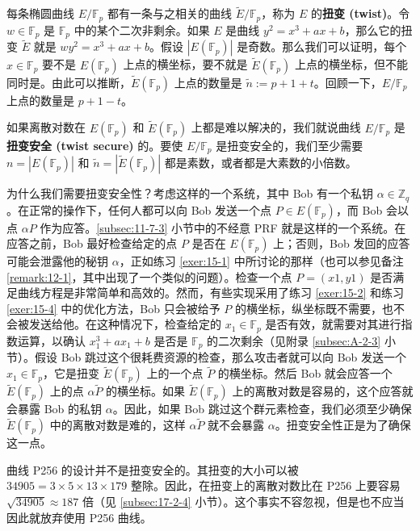 \begin{snote}[扭变安全性。]
每条椭圆曲线 $E/\mathbb{F}_p$ 都有一条与之相关的曲线 $\tilde E/\mathbb{F}_p$，称为 $E$ 的\textbf{扭变 (twist)}。令 $w\in\mathbb{F}_p$ 是 $\mathbb{F}_p$ 中的某个二次非剩余。如果 $E$ 是曲线 $y^2=x^3+ax+b$，那么它的扭变 $\tilde E$ 就是 $wy^2=x^3+ax+b$。假设 $|E(\mathbb{F}_{p})|$ 是奇数。那么我们可以证明，每个 $x\in\mathbb{F}_p$ 要不是 $E(\mathbb{F}_{p})$ 上点的横坐标，要不就是 $\tilde E(\mathbb{F}_{p})$ 上点的横坐标，但不能同时是。由此可以推断，$\tilde E(\mathbb{F}_{p})$ 上点的数量是 $\tilde n:=p+1+t$。回顾一下，$E/\mathbb{F}_p$ 上点的数量是 $p+1-t$。

如果离散对数在 $E(\mathbb{F}_{p})$ 和 $\tilde E(\mathbb{F}_{p})$ 上都是难以解决的，我们就说曲线 $E/\mathbb{F}_p$ 是\textbf{扭变安全 (twist secure)} 的。要使 $E/\mathbb{F}_p$ 是扭变安全的，我们至少需要 $n=|E(\mathbb{F}_{p})|$ 和 $\tilde n= |\tilde E(\mathbb{F}_{p})|$ 都是素数，或者都是大素数的小倍数。

为什么我们需要扭变安全性？考虑这样的一个系统，其中 Bob 有一个私钥 $α\in\mathbb{Z}_q$。在正常的操作下，任何人都可以向 Bob 发送一个点 $P\in E(\mathbb{F}_{p})$，而 Bob 会以点 $\alpha P$ 作为应答。\ref{subsec:11-7-3} 小节中的不经意 PRF 就是这样的一个系统。在应答之前，Bob 最好检查给定的点 $P$ 是否在 $E(\mathbb{F}_{p})$ 上；否则，Bob 发回的应答可能会泄露他的秘钥 $\alpha$，正如练习 \ref{exer:15-1} 中所讨论的那样（也可以参见备注 \ref{remark:12-1}，其中出现了一个类似的问题）。检查一个点 $P=(x1,y1)$ 是否满足曲线方程是非常简单和高效的。然而，有些实现采用了练习 \ref{exer:15-2} 和练习 \ref{exer:15-4} 中的优化方法，Bob 只会被给予 $P$ 的横坐标，纵坐标既不需要，也不会被发送给他。在这种情况下，检查给定的 $x_1∈\mathbb{F}_p$ 是否有效，就需要对其进行指数运算，以确认 $x^3_1+ax_1+b$ 是否是 $\mathbb{F}_p$ 的二次剩余（见附录 \ref{subsec:A-2-3} 小节）。假设 Bob 跳过这个很耗费资源的检查，那么攻击者就可以向 Bob 发送一个 $x_1∈\mathbb{F}_p$，它是扭变 $\tilde E(\mathbb{F}_{p})$ 上的一个点 $\tilde P$ 的横坐标。然后 Bob 就会应答一个 $\tilde E(\mathbb{F}_{p})$ 上的点 $\alpha\tilde P$ 的横坐标。如果 $\tilde E(\mathbb{F}_{p})$ 上的离散对数是容易的，这个应答就会暴露 Bob 的私钥 $\alpha$。因此，如果 Bob 跳过这个群元素检查，我们必须至少确保 $\tilde E(\mathbb{F}_{p})$ 中的离散对数是难的，这样 $\alpha\tilde P$ 就不会暴露 $\alpha$。扭变安全性正是为了确保这一点。

曲线 P256 的设计并不是扭变安全的。其扭变的大小可以被 $34905=3×5×13×179$ 整除。因此，在扭变上的离散对数比在 P256 上要容易 $\sqrt{34905}\approx187$ 倍（见 \ref{subsec:17-2-4} 小节）。这个事实不容忽视，但是也不应当因此就放弃使用 P256 曲线。
\end{snote}

